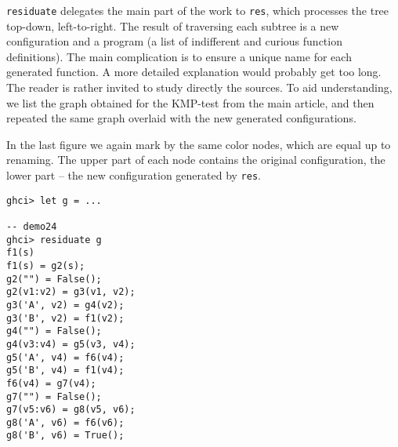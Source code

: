 \texttt{residuate} delegates the main part of the work to \texttt{res}, which processes 
the tree top-down, left-to-right.
The result of traversing each subtree is a new configuration and a program
(a list of indifferent and curious function definitions).
The main complication is to ensure a unique name for each
generated function.
A more detailed explanation would probably get too long.
The reader is rather invited to study directly the sources.
To aid understanding, we list the graph obtained for the KMP-test
from the main article, and then repeated the same graph
overlaid with the new generated configurations.

\newpage





In the last figure we again mark by the same color nodes, which are equal
up to renaming.
The upper part of each node contains the original configuration,
the lower part -- the new configuration generated by \texttt{res}.

\begin{lstlisting}[style=demo,escapechar=!]
ghci> let g = ...

-- demo24
ghci> residuate g
f1(s)
f1(s) = g2(s);
g2("") = False();
g2(v1:v2) = g3(v1, v2);
g3('A', v2) = g4(v2);
g3('B', v2) = f1(v2);
g4("") = False();
g4(v3:v4) = g5(v3, v4);
g5('A', v4) = f6(v4);
g5('B', v4) = f1(v4);
f6(v4) = g7(v4);
g7("") = False();
g7(v5:v6) = g8(v5, v6);
g8('A', v6) = f6(v6);
g8('B', v6) = True();
\end{lstlisting}